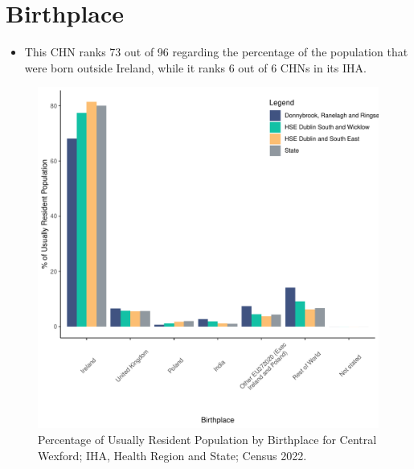 \documentclass{article}
\begin{document}
\section{Birthplace}\label{sect:Birth}
\begin{itemize}
\item This CHN ranks  73 out of 96 regarding the percentage of the population that were born outside Ireland, while it ranks  6 out of 6 CHNs in its IHA.
\end{itemize}
\begin{figure}[H]
	\centering
	\includegraphics[width = 130mm]{../figures/BirthED.pdf}
	\caption{Percentage of Usually Resident Population by Birthplace for Central Wexford; IHA, Health Region and State; Census 2022.}
	\label{fig:vbnv}
	\end{figure}
	
\end{document}
